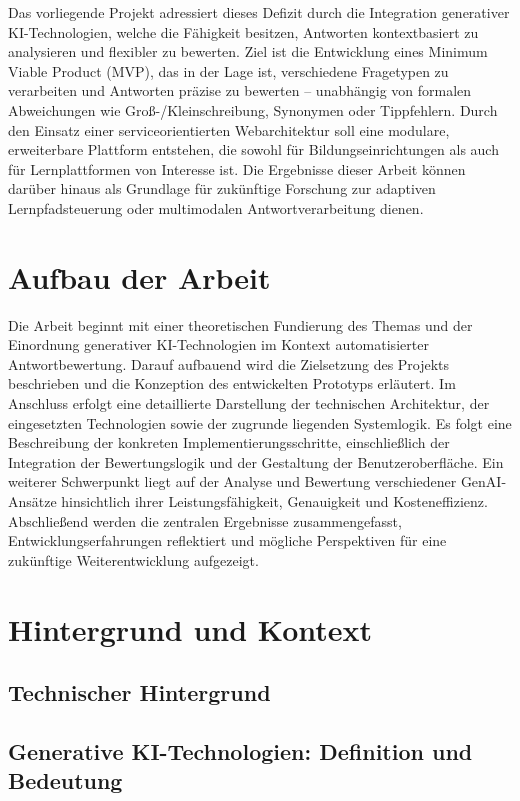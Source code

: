 \documentclass[a4paper,12pt]{article}
\begin{document}
Das vorliegende Projekt adressiert dieses Defizit durch die Integration generativer KI-Technologien, welche die Fähigkeit besitzen, Antworten kontextbasiert zu analysieren und flexibler zu bewerten. Ziel ist die Entwicklung eines Minimum Viable Product (MVP), das in der Lage ist, verschiedene Fragetypen zu verarbeiten und Antworten präzise zu bewerten – unabhängig von formalen Abweichungen wie Groß-/Kleinschreibung, Synonymen oder Tippfehlern. Durch den Einsatz einer serviceorientierten Webarchitektur soll eine modulare, erweiterbare Plattform entstehen, die sowohl für Bildungseinrichtungen als auch für Lernplattformen von Interesse ist. Die Ergebnisse dieser Arbeit können darüber hinaus als Grundlage für zukünftige Forschung zur adaptiven Lernpfadsteuerung oder multimodalen Antwortverarbeitung dienen.

\section{Aufbau der Arbeit}
Die Arbeit beginnt mit einer theoretischen Fundierung des Themas und der Einordnung generativer KI-Technologien im Kontext automatisierter Antwortbewertung. Darauf aufbauend wird die Zielsetzung des Projekts beschrieben und die Konzeption des entwickelten Prototyps erläutert. Im Anschluss erfolgt eine detaillierte Darstellung der technischen Architektur, der eingesetzten Technologien sowie der zugrunde liegenden Systemlogik. Es folgt eine Beschreibung der konkreten Implementierungsschritte, einschließlich der Integration der Bewertungslogik und der Gestaltung der Benutzeroberfläche. Ein weiterer Schwerpunkt liegt auf der Analyse und Bewertung verschiedener GenAI-Ansätze hinsichtlich ihrer Leistungsfähigkeit, Genauigkeit und Kosteneffizienz. Abschließend werden die zentralen Ergebnisse zusammengefasst, Entwicklungserfahrungen reflektiert und mögliche Perspektiven für eine zukünftige Weiterentwicklung aufgezeigt.

\newpage

\section{Hintergrund und Kontext}
\subsection{Technischer Hintergrund}
\subsection{Generative KI-Technologien: Definition und Bedeutung}
\end{document}

